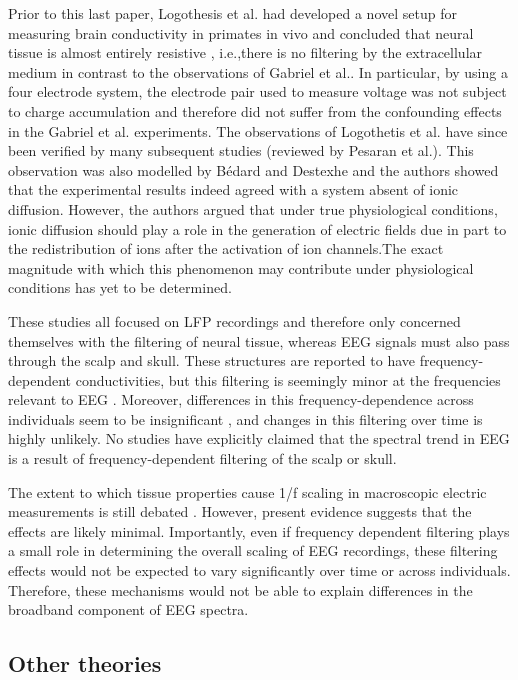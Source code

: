 Prior to this last paper, Logothesis et al.\cite{Logothetis2007} had developed a novel setup for measuring brain conductivity in primates in vivo and concluded that neural tissue is almost entirely resistive , i.e.,there is no filtering by the extracellular medium in contrast to the observations of Gabriel et al.\cite{Gabriel1996}. In particular, by using a four electrode system, the electrode pair used to measure voltage was not subject to charge accumulation and therefore did not suffer from the confounding effects in the Gabriel et al. experiments. The observations of Logothetis et al. have since been verified by many subsequent studies (reviewed by Pesaran et al.\cite{Pesaran2018}). This observation was also modelled by Bédard and Destexhe\cite{Bedard2006a} and the authors showed that the experimental results indeed agreed with a system absent of ionic diffusion. However, the authors argued that under true physiological conditions, ionic diffusion should play a role in the generation of electric fields due in part to the redistribution of ions after the activation of ion channels.The exact magnitude with which this phenomenon may contribute under physiological conditions has yet to be determined.

These studies all focused on LFP recordings and therefore only concerned themselves with the filtering of neural tissue, whereas EEG signals must also pass through the scalp and skull. These structures are reported to have frequency-dependent conductivities, but this filtering is seemingly minor at the frequencies relevant to EEG \cite{Pfurtscheller1975, Akhtari2002, Pesaran2018}. Moreover, differences in this frequency-dependence across individuals seem to be insignificant \cite{Akhtari2002}, and changes in this filtering over time is highly unlikely. No studies have explicitly claimed that the spectral trend in EEG is a result of frequency-dependent filtering of the scalp or skull.

The extent to which tissue properties cause 1/f scaling in macroscopic electric measurements is still debated \cite{Bedard2017}. However, present evidence suggests that the effects are likely minimal. Importantly, even if frequency dependent filtering plays a small role in determining the overall scaling of EEG recordings, these filtering effects would not be expected to vary significantly over time or across individuals. Therefore, these mechanisms would not be able to explain differences in the broadband component of EEG spectra. 

\subsection{Other theories} \label{sec:other_theories}


